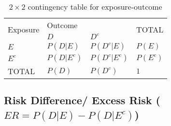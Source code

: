 \begin{customArrayStretch}{1.2}
\begin{table}[H]
    \centering
    \begin{tabular}{|l|l|l|l|}
        \hline

        \multirow{2}{*}{Exposure} &  \multicolumn{2}{|l|}{Outcome} & \multirow{2}{*}{TOTAL} \\
        \cline{2-3}
        & $D$ & $D^c$ & \\
        \hline

        $E$ & $P(D|E)$ & $P(D^c|E)$ & $P(E)$ \\ \hline
        
        $E^c$ & $P(D|E^c)$ & $P(D^c|E^c)$ & $P(E^c)$ \\ \hline
    
        TOTAL & $P(D)$ & $P(D^c)$ & $1$ \\ \hline

    \end{tabular}
    \caption{$2 \times 2$ contingency table for exposure-outcome}
    \label{statistics/probability-theory/Conditional Probability/contingency-table-exposure-outcome}
\end{table}
\end{customArrayStretch}

\subsection{Risk Difference/ Excess Risk ($ER = P(D|E) - P(D|E^c)$)}

